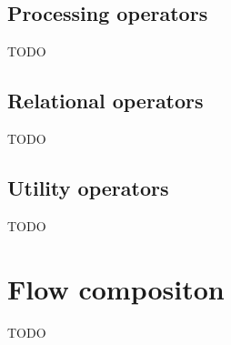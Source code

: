 \subsection{Processing operators}
TODO

\subsection{Relational operators}
TODO

\subsection{Utility operators}
TODO

\section{Flow compositon}
TODO